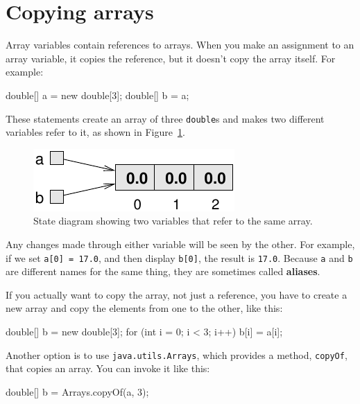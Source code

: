 \documentclass[12pt]{book}
\theoremstyle{exercise}
\newcommand{\java}[1]{\verb"#1"}
\begin{document}
\section{Copying arrays}
\label{copyarray}

Array variables contain references to arrays.
When you make an assignment to an array variable, it copies the reference, but it doesn't copy the array itself.
For example:

\begin{code}
    double[] a = new double[3];
    double[] b = a;
\end{code}

These statements create an array of three \java{double}s and makes two different variables refer to it, as shown in Figure~\ref{fig.array3}.

\begin{figure}
\begin{center}
\includegraphics{figs/array3.pdf}
\caption{State diagram showing two variables that refer to the same array.}
\label{fig.array3}
\end{center}
\end{figure}

Any changes made through either variable will be seen by the other.
For example, if we set \java{a[0] = 17.0}, and then display {\tt b[0]}, the result is \java{17.0}.
Because \java{a} and \java{b} are different names for the same thing, they are sometimes called {\bf aliases}.

If you actually want to copy the array, not just a reference, you have to create a new array and copy the elements from one to the other, like this:

\begin{code}
    double[] b = new double[3];
    for (int i = 0; i < 3; i++) {
        b[i] = a[i];
    }
\end{code}

Another option is to use \java{java.utils.Arrays}, which provides a method, \java{copyOf}, that copies an array.
You can invoke it like this:

\begin{code}
    double[] b = Arrays.copyOf(a, 3);
\end{code}
\end{document}
